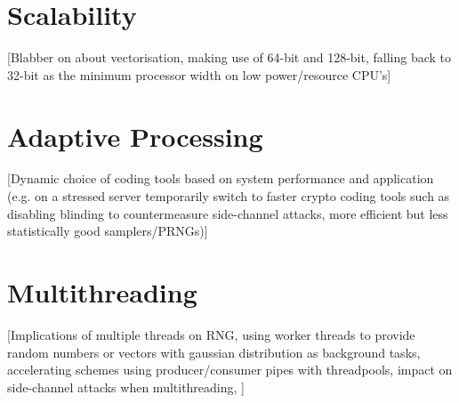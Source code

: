 \section{Scalability}

[Blabber on about vectorisation, making use of 64-bit and 128-bit, falling back to 32-bit as the minimum processor width on low power/resource CPU's]

\section{Adaptive Processing}

[Dynamic choice of coding tools based on system performance and application (e.g. on a stressed server temporarily switch to faster crypto coding tools such as disabling blinding to countermeasure side-channel attacks, more efficient but less statistically good samplers/PRNGs)]


\section{Multithreading}

[Implications of multiple threads on RNG, using worker threads to provide random numbers or vectors with gaussian distribution as background tasks, accelerating schemes using producer/consumer pipes with threadpools, impact on side-channel attacks when multithreading, ]
